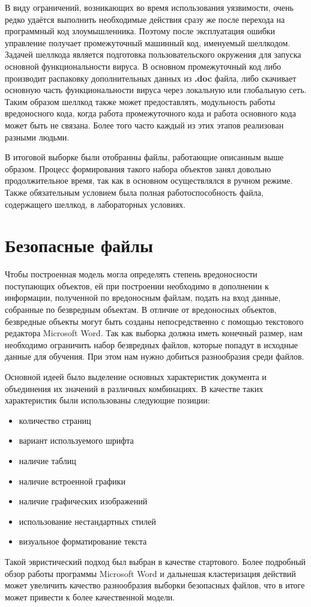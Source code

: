 В виду ограничений, возникающих во время использования уязвимости, очень редко удаётся выполнить необходимые действия сразу же после перехода на программный код злоумышленника.
Поэтому после эксплуатация ошибки управление получает промежуточный машинный код, именуемый шеллкодом.
Задачей шеллкода является подготовка пользовательского окружения для запуска основной функциональности вируса.
В основном промежуточный код либо производит распаковку дополнительных данных из \textbf{.doc} файла, либо скачивает основную часть функциональности вируса через локальную или глобальную сеть.
Таким образом шеллкод также может предоставлять, модульность работы вредоносного кода, когда работа промежуточного кода и работа основного кода может быть не связана. Более того часто каждый из этих этапов реализован разными людьми.

В итоговой выборке были отобранны файлы, работающие описанным выше образом.
Процесс формирования такого набора объектов занял довольно продолжительное время, так как в основном осуществлялся в ручном режиме.
Также обязательным условием была полная работоспособность файла, содержащего шеллкод, в лабораторных условиях.

\section{Безопасные файлы}

Чтобы построенная модель могла определять степень вредоносности поступающих объектов, ей при построении необходимо в дополнении к информации, полученной по вредоносным файлам, подать на вход данные, собранные по безвредным объектам.
В отличие от вредоносных объектов, безвредные объекты могут быть созданы непосредственно с помощью текстового редактора Microsoft Word.
Так как выборка должна иметь конечный размер, нам необходимо ограничить набор безвредных файлов, которые попадут в исходные данные для обучения.
При этом нам нужно добиться разнообразия среди файлов.

Основной идеей было выделение основных характеристик документа и объединения их значений в различных комбинациях.
В качестве таких характеристик были использованы следующие позиции:
\begin{itemize}
\item количество страниц
\item вариант используемого шрифта
\item наличие таблиц
\item наличие встроенной графики
\item наличие графических изображений
\item использование нестандартных стилей
\item визуальное форматирование текста
\end{itemize}

Такой эвристический подход был выбран в качестве стартового.
Более подробный обзор работы программы Microsoft Word и дальнешая кластеризация действий может увеличить качество разнообразия выборки безопасных файлов, что в итоге может привести к более качественной модели.